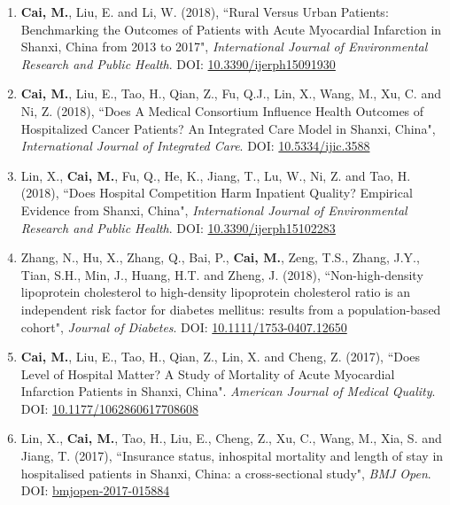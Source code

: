 \documentclass[11pt, a4paper]{article}
\newcommand{\years}[1]{\marginnote{\scriptsize #1}}
\begin{document}
\begin{enumerate}[leftmargin=0ex,itemsep=1ex]
		
		
		\item \textbf{Cai, M.}, Liu, E. and Li, W. (2018), ``Rural Versus Urban Patients: Benchmarking the Outcomes of Patients with Acute Myocardial Infarction in Shanxi, China from 2013 to 2017", \emph{International Journal of Environmental Research and Public Health}. DOI: \href{https://doi.org/10.3390/ijerph15091930}{10.3390/ijerph15091930}
		
		\item \textbf{Cai, M.}, Liu, E., Tao, H., Qian, Z., Fu, Q.J., Lin, X., Wang, M., Xu, C. and Ni, Z. (2018), ``Does A Medical Consortium Influence Health Outcomes of Hospitalized Cancer Patients? An Integrated Care Model in Shanxi, China", \emph{International Journal of Integrated Care}. DOI: \href{https://doi.org/10.5334/ijic.3588}{10.5334/ijic.3588}
		
		\item \years{2018}Lin, X., \textbf{Cai, M.}, Fu, Q., He, K., Jiang, T., Lu, W., Ni, Z. and Tao, H. (2018), ``Does Hospital Competition Harm Inpatient Quality? Empirical Evidence from Shanxi, China", \emph{International Journal of Environmental Research and Public Health}. DOI: \href{https://doi.org/10.3390/ijerph15102283}{10.3390/ijerph15102283}
		
		\item Zhang, N., Hu, X., Zhang, Q., Bai, P., \textbf{Cai, M.}, Zeng, T.S., Zhang, J.Y., Tian, S.H., Min, J., Huang, H.T. and Zheng, J. (2018), ``Non-high-density lipoprotein cholesterol to high-density lipoprotein cholesterol ratio is an independent risk factor for diabetes mellitus: results from a population-based cohort", \emph{Journal of Diabetes}. DOI: \href{https://doi.org/10.1111/1753-0407.12650}{10.1111/1753-0407.12650}
		
		
		\item \years{2017}\textbf{Cai, M.}, Liu, E., Tao, H., Qian, Z., Lin, X. and Cheng, Z. (2017), ``Does Level of Hospital Matter? A Study of Mortality of Acute Myocardial Infarction Patients in Shanxi, China". \emph{American Journal of Medical Quality}. DOI: \href{https://doi.org/10.1177/1062860617708608}{10.1177/1062860617708608}
		
		\item Lin, X., \textbf{Cai, M.}, Tao, H., Liu, E., Cheng, Z., Xu, C., Wang, M., Xia, S. and Jiang, T. (2017), ``Insurance status, inhospital mortality and length of stay in hospitalised patients in Shanxi, China: a cross-sectional study", \emph{BMJ Open}. DOI: \href{https://doi.org/10.1136/bmjopen-2017-015884}{bmjopen-2017-015884}
		

\end{enumerate}
\end{document}
